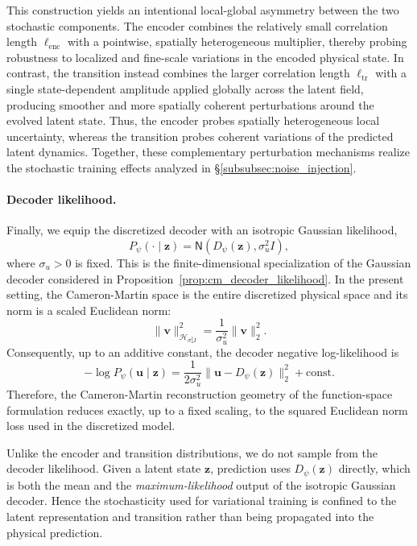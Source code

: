 \documentclass[11pt]{article}
\begin{document}
This construction yields an intentional local-global asymmetry between the two stochastic components. The encoder combines the relatively small correlation length $\ell_{\mathrm{enc}}$ with a pointwise, spatially heterogeneous multiplier, thereby probing robustness to localized and fine-scale variations in the encoded physical state. In contrast, the transition instead combines the larger correlation length $\ell_{\mathrm{tr}}$ with a single state-dependent amplitude applied globally across the latent field, producing smoother and more spatially coherent perturbations around the evolved latent state. Thus, the encoder probes spatially heterogeneous local uncertainty, whereas the transition probes coherent variations of the predicted latent dynamics. Together, these complementary perturbation mechanisms realize the stochastic training effects analyzed in \S\ref{subsubsec:noise_injection}.

\paragraph{Decoder likelihood.}
Finally, we equip the discretized decoder with an isotropic Gaussian likelihood,
\begin{equation}
    P_\psi(\cdot\mid\mathbf z)
    =
    \mathsf N\!\left(
        D_\psi(\mathbf z),
        \sigma_u^2 I
    \right),
    \label{eq:discrete_decoder_likelihood}
\end{equation}
where $\sigma_u>0$ is fixed. This is the finite-dimensional specialization of the Gaussian decoder considered in Proposition~\ref{prop:cm_decoder_likelihood}. In the present setting, the Cameron-Martin space is the entire discretized physical space and its norm is a scaled Euclidean norm:
\[
    \|\mathbf v\|_{\mathcal H_{\sigma_u^2 I}}^2
    =
    \frac{1}{\sigma_u^2}\|\mathbf v\|_2^2.
\]
Consequently, up to an additive constant, the decoder negative
log-likelihood is
\[
    -\log P_\psi(\mathbf u\mid\mathbf z)
    =
    \frac{1}{2\sigma_u^2}
    \|\mathbf u-D_\psi(\mathbf z)\|_2^2
    +\mathrm{const}.
\]
Therefore, the Cameron-Martin reconstruction geometry of the function-space formulation reduces exactly, up to a fixed scaling, to the squared Euclidean norm loss used in the discretized model.

Unlike the encoder and transition distributions, we do not sample from the decoder likelihood. Given a latent state $\mathbf z$, prediction uses $D_\psi(\mathbf z)$ directly, which is both the mean and the \textit{maximum-likelihood} output of the isotropic Gaussian decoder. Hence the stochasticity used for variational training is confined to the latent representation and transition rather than being propagated into the physical prediction.
\end{document}
